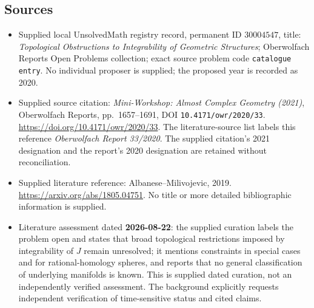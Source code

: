 \documentclass[11pt]{article}
\begin{document}
\subsection{Sources}
\begin{itemize}
\item Supplied local UnsolvedMath registry record, permanent ID \(30004547\), title: \emph{Topological Obstructions to Integrability of Geometric Structures}; Oberwolfach Reports Open Problems collection; exact source problem code \texttt{catalogue entry}. No individual proposer is supplied; the proposed year is recorded as 2020.
\item Supplied source citation: \emph{Mini-Workshop: Almost Complex Geometry (2021)}, Oberwolfach Reports, pp.\ 1657--1691, DOI \texttt{10.4171/owr/2020/33}. \url{https://doi.org/10.4171/owr/2020/33}. The literature-source list labels this reference \emph{Oberwolfach Report 33/2020}. The supplied citation's 2021 designation and the report's 2020 designation are retained without reconciliation.
\item Supplied literature reference: Albanese--Milivojevic, 2019. \url{https://arxiv.org/abs/1805.04751}. No title or more detailed bibliographic information is supplied.
\item Literature assessment dated \textbf{2026-08-22}: the supplied curation labels the problem open and states that broad topological restrictions imposed by integrability of \(J\) remain unresolved; it mentions constraints in special cases and for rational-homology spheres, and reports that no general classification of underlying manifolds is known. This is supplied dated curation, not an independently verified assessment. The background explicitly requests independent verification of time-sensitive status and cited claims.
\end{itemize}
\end{document}
